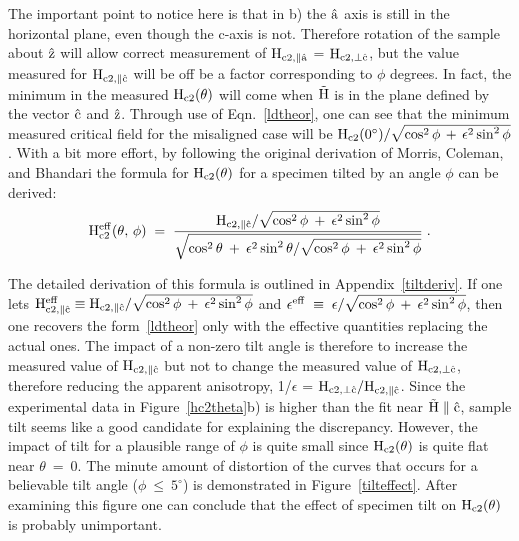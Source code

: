         The important  point to notice  here  is that in b) the $\rm
\hat{a}$   axis is still in the horizontal plane, even though the c-axis is
not.  Therefore rotation of the sample about $\rm \hat{z}$ will allow
correct measurement of $\rm H_{c2,\parallel \hat{a}}$ = $\rm H_{c2,\perp
\hat{c}}$, but the value measured for $\rm H_{c2, \parallel \hat{c}}$ will
be off be a factor  corresponding to $\phi$  degrees.  In fact, the minimum
in the measured $\rm H_{c2}(\theta)$ will come when $\rm \vec{H}$ is in the
plane  defined by the vector $\rm  \hat{c}$ and $\rm \hat{z}$.  Through use
of Eqn.~\ref{ldtheor}, one can see that the minimum measured critical field
for the misaligned case will be $\rm H_{c2}(0^{\circ})/\sqrt{\cos^2 \phi \,
+  \, \epsilon^2 \sin^2  \phi}$.  With a  bit more effort, by following the
original derivation  of  Morris,  Coleman, and  Bhandari\cite{morris72} the
formula for $\rm H_{c2}(\theta)$  for a specimen tilted by  an angle $\phi$
can be derived:\\

\begin{equation}
\label{tilthc2}
\rm H_{c2}^{eff}(\theta,\, \phi) \; = \; \frac{H_{c2, \parallel
\hat{c}}/\sqrt{\cos^2\phi \: + \: \epsilon^2\sin^2\phi}}{\sqrt{\cos^2\theta
\: + \: \epsilon^2\sin^2\theta / \sqrt{\cos^2\phi \: + \: \epsilon^2\sin^2\phi}}} \; .
\end{equation}

\noindent  The detailed derivation of this formula is outlined in 
Appendix~\ref{tiltderiv}.  If one  lets $\rm H_{c2,\parallel \hat{c}}^{eff}
\equiv    H_{c2,\parallel     \hat{c}}/\sqrt{\cos^2\phi   \:     +       \:
\epsilon^2\sin^2\phi}$    and    $\rm     \epsilon^{eff}  \;   \equiv    \;
\epsilon/\sqrt{\cos^2\phi \: + \:
\epsilon^2\sin^2\phi}$, then one recovers the form~\ref{ldtheor} only with
the   effective  quantities  replacing  the actual  ones.   The impact of a
non-zero  tilt angle is therefore  to increase the measured  value  of $\rm
H_{c2,\parallel  \hat{c}}$ but  not  to change  the measured  value of $\rm
H_{c2,\perp  \hat{c}}$,    therefore   reducing  the  apparent  anisotropy,
1/$\epsilon$  = $\rm  H_{c2,\perp\hat{c}}/H_{c2,\parallel \hat{c}}$.  Since
the experimental data  in  Figure~\ref{hc2theta}b)  is higher than  the fit
near $\rm \vec{H}\parallel\hat{c}$, sample tilt seems like a good candidate
for   explaining the  discrepancy.   However,    the impact of  tilt for  a
plausible  range of  $\phi$ is quite  small since  $\rm  H_{c2}(\theta)$ is
quite flat near $\theta \: = \: 0$.  The minute amount of distortion of the
curves that   occurs for  a believable  tilt    angle  ($\phi \:   \leq  \:
5^{\circ}$) is  demonstrated  in  Figure~\ref{tilteffect}.  After examining
this figure one  can conclude that the    effect of specimen tilt  on
$\rm H_{c2}(\theta)$ is probably unimportant.

